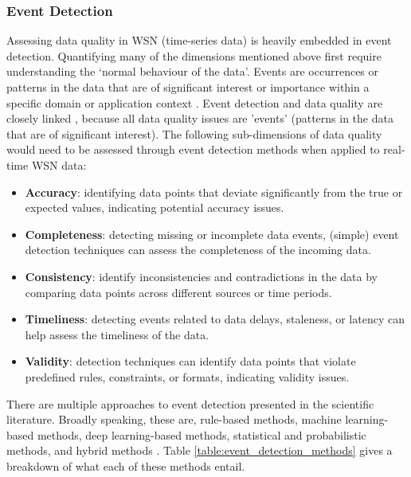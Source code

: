 \subsubsection{Event Detection}
Assessing data quality in WSN (time-series data) is heavily embedded in event detection. Quantifying many of the dimensions mentioned above first require understanding the ‘normal behaviour of the data’. Events are occurrences or patterns in the data that are of significant interest or importance within a specific domain or application context \citep{benabbasContextawareOutlierDetection2023}. Event detection and data quality are closely linked \citep{kumarSurveyEventDetection2023}, because all data quality issues are 'events' (patterns in the data that are of significant interest). The following sub-dimensions of data quality would need to be assessed through event detection methods when applied to real-time WSN data:

\begin{itemize}
    \item \textbf{Accuracy}: identifying data points that deviate significantly from the true or expected values, indicating potential accuracy issues.
    \item \textbf{Completeness}: detecting missing or incomplete data events, (simple) event detection techniques can assess the completeness of the incoming data.
    \item \textbf{Consistency}: identify inconsistencies and contradictions in the data by comparing data points across different sources or time periods.
    \item \textbf{Timeliness}: detecting events related to data delays, staleness, or latency can help assess the timeliness of the data.
    \item \textbf{Validity}: detection techniques can identify data points that violate predefined rules, constraints, or formats, indicating validity issues.
\end{itemize}

There are multiple approaches to event detection presented in the scientific literature. Broadly speaking, these are, rule-based methods, machine learning-based methods, deep learning-based methods, statistical and probabilistic methods, and hybrid methods \cite{kumarSurveyEventDetection2023}. Table \ref{table:event_detection_methods} gives a breakdown of what each of these methods entail.



